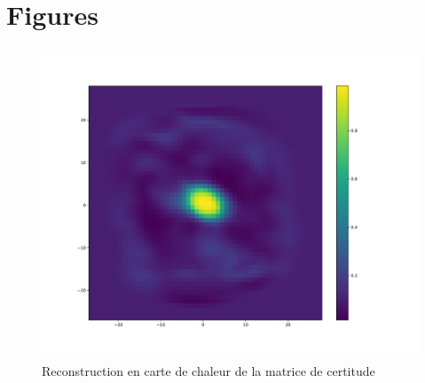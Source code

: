
\chapter{Figures} %

\label{Figures} %



\begin{table}
\caption[Tableau]{Matériel utilisé pour réaliser les modélisations
}
\label{tab:materiel}
\end{table}

\begin{figure}[th]
\centering
\includegraphics[scale=0.4]{Figures/accuracy}
\decoRule
\caption[Figure]{Reconstruction en carte de chaleur de la matrice de certitude}
\label{fig:accuracy}
\end{figure}

